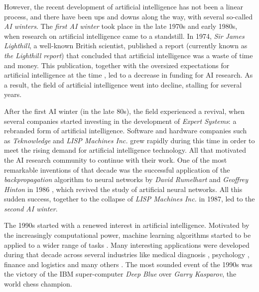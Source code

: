 However, the recent development of artificial intelligence has not been a linear process, and there have been ups and downs along the way, with several so-called \textit{AI winters}. The \textit{first AI winter} took place in the late 1970s and early 1980s, when research on artificial intelligence came to a standstill. In 1974, \textit{Sir James Lighthill}, a well-known British scientist, published a report \autocite{lighthillReport} (currently known as \textit{the Lighthill report}) that concluded that artificial intelligence was a waste of time and money. This publication, together with the oversized expectations for artificial intelligence at the time \autocite{russellNorvig}, led to a decrease in funding for AI research. As a result, the field of artificial intelligence went into decline, stalling for several years.

After the first AI winter (in the late 80s), the field experienced a revival, when several companies started investing in the development of \textit{Expert Systems}: a rebranded form of artificial intelligence. Software and hardware companies such as \textit{Teknowledge} and \textit{LISP Machines Inc.} grew rapidly during this time in order to meet the rising demand for artificial intelligence technology. All that motivated the AI research community to continue with their work. One of the most remarkable inventions of that decade was the successful application of the \textit{backpropagation} algorithm to neural networks by \textit{David Rumelhart} and \textit{Geoffrey Hinton} in 1986 \autocite{hinton1986}, which revived the study of artificial neural networks. All this sudden success, together to the collapse of \textit{LISP Machines Inc.} in 1987, led to the \textit{second AI winter}.

The 1990s started with a renewed interest in artificial intelligence. Motivated by the increasingly computational power, machine learning algorithms started to be applied to a wider range of tasks \autocite{Tesauro:1995}. Many interesting applications were developed during that decade across several industries like medical diagnosis \autocite{declaris1991, Klein1991, punch1992, Cinar1999}, psychology \autocite{Dorrer1995, denby1999, Ogawa1999, Perlovsky1999}, finance and logistics \autocite{Lipshutz1991, Benaroch1991, Johnson1991, Falas1994} and many others \autocite{Smithers1993, Yoo1994, Mashaly1994, Koyma1998}. The most sounded event of the 1990s was the victory of the IBM super-computer \textit{Deep Blue} \autocite{Campbell2002} over \textit{Garry Kasparov}, the world chess champion.

